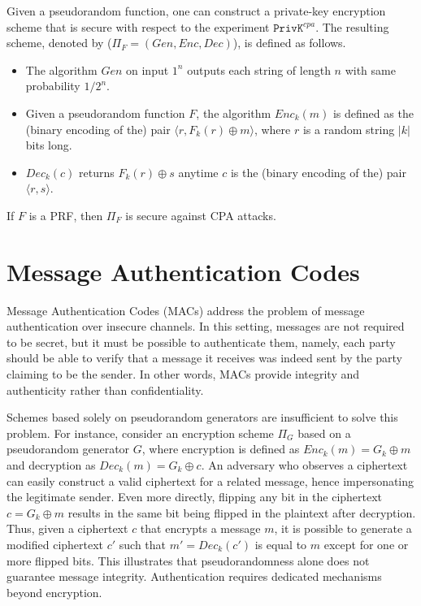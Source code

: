 Given a pseudorandom function, one can construct a private-key encryption scheme that is secure with respect to the experiment $\mathtt{PrivK}^{cpa}$. The resulting scheme, denoted by ($\Pi_F = (Gen, Enc, Dec)$), is defined as follows.
\begin{itemize}
    \item The algorithm $Gen$ on input $1^n$ outputs each string of length $n$ with same probability $1/2^n$.
    \item Given a pseudorandom function $F$, the algorithm $Enc_k(m)$ is defined as the (binary encoding of the) pair $\langle r, F_k(r) \oplus m\rangle$, where $r$ is a random string $|k|$ bits long.
    \item $Dec_k(c)$ returns $F_k(r) \oplus s$ anytime $c$ is the (binary encoding of the) pair $\langle r, s\rangle$.
\end{itemize}

\begin{theorem}
If $F$ is a PRF, then $\Pi_F$ is secure against CPA attacks.
\end{theorem}

\section{Message Authentication Codes}
Message Authentication Codes (MACs) address the problem of message authentication over insecure channels. In this setting, messages are not required to be secret, but it must be possible to authenticate them, namely, each party should be able to verify that a message it receives was indeed sent by the party claiming to be the sender. In other words, MACs provide integrity and authenticity rather than confidentiality. 

Schemes based solely on pseudorandom generators are insufficient to solve this problem. For instance, consider an encryption scheme $\Pi_G$ based on a pseudorandom generator $G$, where encryption is defined as $Enc_k(m) = G_k \oplus m$ and decryption as $Dec_k(m) = G_k \oplus c$. An adversary who observes a ciphertext can easily construct a valid ciphertext for a related message, hence impersonating the legitimate sender. Even more directly, flipping any bit in the ciphertext $c = G_k \oplus m$ results in the same bit being flipped in the plaintext after decryption. Thus, given a ciphertext $c$ that encrypts a message $m$, it is possible to generate a modified ciphertext $c'$ such that $m' = Dec_k(c')$ is equal to $m$ except for one or more flipped bits. This illustrates that pseudorandomness alone does not guarantee message integrity. Authentication requires dedicated mechanisms beyond encryption.

